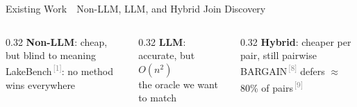 \documentclass[aspectratio=169]{beamer}
\newcommand{\hred}[1]{\textcolor{tug}{\textbf{#1}}}
\newcommand{\hblue}[1]{\textcolor{tugb}{\textbf{#1}}}
\newcommand{\rf}[1]{\textsuperscript{\textcolor{gray}{\,[#1]}}}
\newcommand{\apptitle}[3]{\textcolor{#1}{#2}~\textcolor{black!30}{\textbar}~#3}
\begin{document}
\begin{frame}{\apptitle{black!60}{Existing Work}{Non-LLM, LLM, and Hybrid Join Discovery}}
\vspace{2mm}
\begin{columns}[T]
\begin{column}{0.32\textwidth}\centering
\textbf{\hblue{Non-LLM}}: cheap, but blind to meaning\\{\tiny LakeBench\rf{1}: no method wins everywhere}
\end{column}
\begin{column}{0.32\textwidth}\centering
\textbf{\hred{LLM}}: accurate, but $O(n^2)$\\{\tiny the oracle we want to match}
\end{column}
\begin{column}{0.32\textwidth}\centering
\textbf{\textcolor{uwgoldD}{Hybrid}}: cheaper per pair, still pairwise\\{\tiny BARGAIN\rf{8} defers $\approx$80\% of pairs\rf{9}}
\end{column}
\end{columns}
\end{frame}
\end{document}
